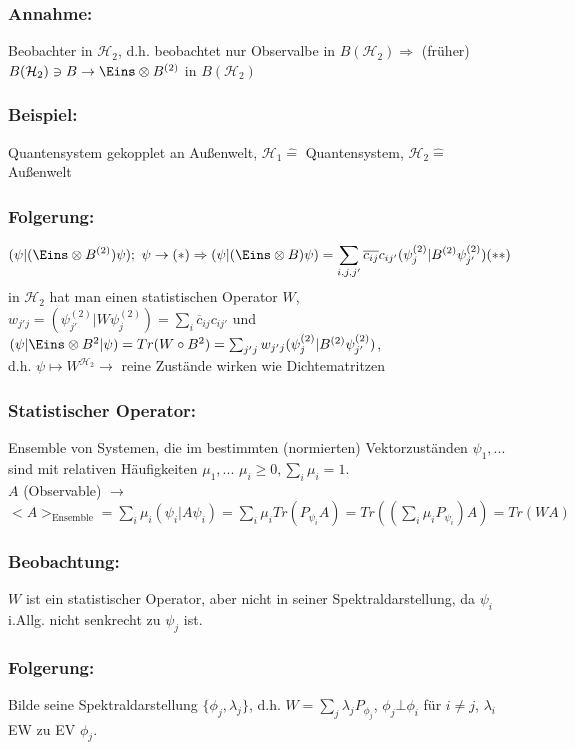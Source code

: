 \documentclass[twoside,a4paper]{scrartcl}
\renewcommand{\1}{\mathds{1}}
\newcommand{\Ra}{\Rightarrow}
\newcommand{\ra}{\rightarrow}
\renewcommand{\l}{\lambda}
\renewcommand{\H}{\mathcal{H}}
\begin{document}
\subsubsection*{Annahme:}
Beobachter in $\H_2$, d.h. beobachtet nur Observalbe in $B(\H_2) \Ra$ (früher) $B(\H_2) \ni B \ra \Eins \otimes B^{(2)}$ in $B(\H_2)$
\subsubsection*{Beispiel:}
Quantensystem gekopplet an Außenwelt, $\H_1 \mathrel{\widehat{=}}$ Quantensystem, $\H_2\mathrel{\widehat{=}}$ Außenwelt
\subsubsection*{Folgerung:}
$$(\psi|(\Eins\otimes B^{(2)})\psi); \ \psi \ra (*) \Ra (\psi|(\Eins\otimes B)\psi)=\sum_{i,j,j'} \overline{c_{ij}}c_{ij'}(\psi_j^{(2)}|B^{(2)} \psi_{j'}^{(2)}) (**)$$
in $\H_2$ hat man einen statistischen Operator $W$, $w_{j'j}=(\psi^{(2)}_{j'}|W\psi^{(2)}_{j})=\sum_i \overline{c}_{ij}c_{ij'}$ und $(\psi|\Eins \otimes B^2|\psi)=Tr(W \circ B^2)=\sum_{j'j} w_{j'j}(\psi^{(2)}_{j}|B^{(2)}\psi^{(2)}_{j'})$,\\
d.h. $\psi \mapsto W^{\H_2} \ra$ reine Zustände wirken wie Dichtematritzen
\subsubsection*{Statistischer Operator:} 
Ensemble von Systemen, die im bestimmten (normierten) Vektorzuständen $\psi_1,...$ sind mit relativen Häufigkeiten $\mu_1,...$ $\mu_i\geq 0, \sum_i \mu_i=1$.\\
$A$ (Observable) $\ra$ $<A>_{\mathrm{Ensemble}}=\sum_i \mu_i (\psi_i|A\psi_i)=\sum_i \mu_i Tr(P_{\psi_i}A)=Tr((\sum_i \mu_i P_{\psi_i})A)=Tr(WA)$
\subsubsection*{Beobachtung:} 
$W$ ist ein statistischer Operator, aber nicht in seiner Spektraldarstellung, da $\psi_i$ i.Allg. nicht senkrecht zu $\psi_j$ ist.
\subsubsection*{Folgerung:} 
Bilde seine Spektraldarstellung $\{\phi_j,\l_j\}$, d.h. $W=\sum_j \l_j P_{\phi_j}$, $\phi_j \bot \phi_i$ für $i\neq j$, $\l_i$ EW zu EV $\phi_j$.
\end{document}
